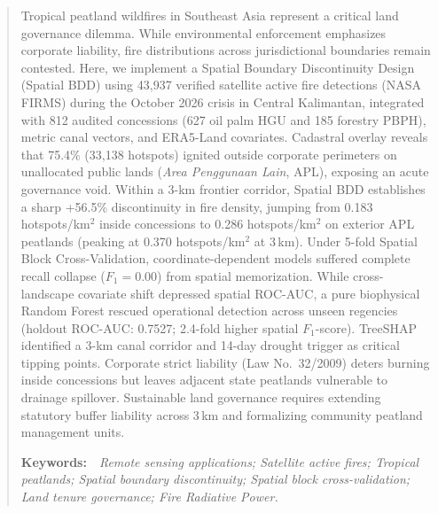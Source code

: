 \begin{abstract}
\noindent
Tropical peatland wildfires in Southeast Asia represent a critical land governance dilemma. While environmental enforcement emphasizes corporate liability, fire distributions across jurisdictional boundaries remain contested. Here, we implement a Spatial Boundary Discontinuity Design (Spatial BDD) using 43,937 verified satellite active fire detections (NASA FIRMS) during the October 2026 crisis in Central Kalimantan, integrated with 812 audited concessions (627 oil palm HGU and 185 forestry PBPH), metric canal vectors, and ERA5-Land covariates. Cadastral overlay reveals that 75.4\% (33,138 hotspots) ignited outside corporate perimeters on unallocated public lands (\textit{Area Penggunaan Lain}, APL), exposing an acute governance void. Within a 3-km frontier corridor, Spatial BDD establishes a sharp +56.5\% discontinuity in fire density, jumping from 0.183 hotspots/km$^2$ inside concessions to 0.286 hotspots/km$^2$ on exterior APL peatlands (peaking at 0.370 hotspots/km$^2$ at 3\,km). Under 5-fold Spatial Block Cross-Validation, coordinate-dependent models suffered complete recall collapse ($F_1 = 0.00$) from spatial memorization. While cross-landscape covariate shift depressed spatial ROC-AUC, a pure biophysical Random Forest rescued operational detection across unseen regencies (holdout ROC-AUC: 0.7527; 2.4-fold higher spatial $F_1$-score). TreeSHAP identified a 3-km canal corridor and 14-day drought trigger as critical tipping points. Corporate strict liability (Law No.~32/2009) deters burning inside concessions but leaves adjacent state peatlands vulnerable to drainage spillover. Sustainable land governance requires extending statutory buffer liability across 3\,km and formalizing community peatland management units.

\vspace{0.4em}
\noindent\textbf{Keywords:}\ \ \textit{Remote sensing applications; Satellite active fires; Tropical peatlands; Spatial boundary discontinuity; Spatial block cross-validation; Land tenure governance; Fire Radiative Power.}
\end{abstract}
